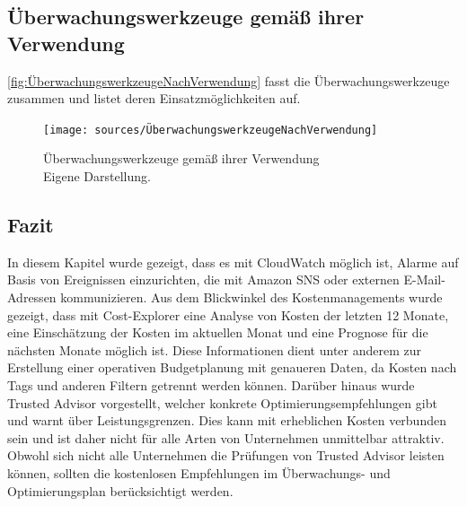 \newpage
\subsection{Überwachungswerkzeuge gemäß ihrer Verwendung}
\autoref{fig:ÜberwachungswerkzeugeNachVerwendung} fasst die Überwachungswerkzeuge zusammen und listet deren Einsatzmöglichkeiten auf.
\begin{figure}[h!]
  \centering
  \texttt{[image: sources/ÜberwachungswerkzeugeNachVerwendung]}
  \caption[Überwachungswerkzeuge gemäß ihrer Verwendung]{}
  \label{fig:ÜberwachungswerkzeugeNachVerwendung} 
  Überwachungswerkzeuge gemäß ihrer Verwendung\\
  Eigene Darstellung\cite{AMZ12, AMZ20, AMZ21}. 
\end{figure}


\subsection*{Fazit}
In diesem Kapitel wurde gezeigt, dass es mit CloudWatch möglich ist, Alarme auf Basis von Ereignissen einzurichten, die mit Amazon SNS oder externen E-Mail-Adressen kommunizieren. %
Aus dem Blickwinkel des Kostenmanagements wurde gezeigt, dass mit Cost-Explorer eine Analyse von Kosten der letzten 12 Monate, eine Einschätzung der Kosten im aktuellen Monat und eine Prognose für die nächsten Monate möglich ist. Diese Informationen dient unter anderem zur Erstellung einer operativen Budgetplanung mit genaueren Daten, da
Kosten nach Tags und anderen Filtern getrennt werden können.
Darüber hinaus wurde Trusted Advisor vorgestellt, welcher konkrete Optimierungsempfehlungen gibt und warnt über Leistungsgrenzen. Dies kann mit erheblichen Kosten verbunden sein und ist daher nicht für alle Arten von Unternehmen unmittelbar attraktiv. Obwohl sich nicht alle Unternehmen die Prüfungen von Trusted Advisor leisten können, sollten die kostenlosen Empfehlungen im Überwachungs- und Optimierungsplan berücksichtigt werden.

